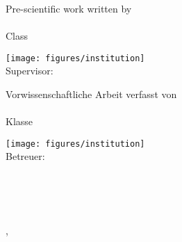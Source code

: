

\thispagestyle{empty}  %
\large  %

\begin{center}

{\LARGE\bfseries\mytitle}

\vfill

{%
Pre-scientific work written by\\[5mm]
{\Large\bfseries\myauthor}\\[5mm]
Class \mystudy\\[50mm]

\vfill

\texttt{[image: figures/institution]}\\[5mm]

Supervisor: \mysupervisor
}
{%
Vorwissenschaftliche Arbeit verfasst von\\[5mm]
{\Large\bfseries\myauthor}\\[5mm]
Klasse \mystudy\\[50mm]

\vfill

\texttt{[image: figures/institution]}\\[5mm]

Betreuer: \mysupervisor
}

\vfill

\myinstitute\\
\myhomestreet\\
\myhomepostalnumber~\myhometown

\vfill

\mysubmissiontown, \mysubmissionmonth~\mysubmissionyear
\end{center}
\normalsize %
\newpage

\newpage


